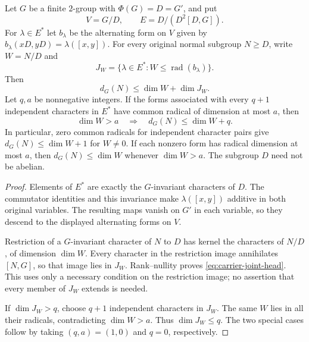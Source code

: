 \begin{lemma}\label{lem:carrier-joint-radicals}
Let $G$ be a finite $2$-group with $\Phi(G)=D=G'$, and put
\[
 V=G/D,\qquad E=D/(D^2[D,G]).
\]
For $\lambda\in E^*$ let $b_\lambda$ be the alternating form on $V$
given by $b_\lambda(xD,yD)=\lambda([x,y])$.
For every original normal subgroup $N\geq D$, write $W=N/D$ and
\[
 J_W=\{\lambda\in E^*: W\leq\operatorname{rad}(b_\lambda)\}.
\]
Then
\begin{equation}\label{eq:carrier-joint-head}
 d_G(N)\leq\dim W+\dim J_W.
\end{equation}
Let $q,a$ be nonnegative integers. If the forms associated with every
$q+1$ independent characters in
$E^*$ have common radical of dimension at most $a$, then
\[
 \dim W>a\quad\Longrightarrow\quad d_G(N)\leq\dim W+q.
\]
In particular, zero common radicals for independent character pairs give
$d_G(N)\leq\dim W+1$ for $W\ne0$. If each nonzero form has radical
dimension at most $a$, then $d_G(N)\leq\dim W$ whenever $\dim W>a$.
The subgroup $D$ need not be abelian.
\end{lemma}
\begin{proof}
Elements of $E^*$ are exactly the $G$-invariant characters of $D$.
The commutator identities and this invariance make
$\lambda([x,y])$ additive in both original variables. The resulting
maps vanish on $G'$ in each variable, so they descend to the displayed
alternating forms on $V$.

Restriction of a $G$-invariant character of $N$ to $D$ has kernel
the characters of $N/D$, of dimension $\dim W$. Every character in
the restriction image annihilates $[N,G]$, so that image lies in
$J_W$. Rank--nullity proves \eqref{eq:carrier-joint-head}. This uses
only a necessary condition on the restriction image; no assertion
that every member of $J_W$ extends is needed.

If $\dim J_W>q$, choose $q+1$ independent characters in $J_W$.
The same $W$ lies in all their radicals, contradicting
$\dim W>a$. Thus $\dim J_W\leq q$. The two special cases follow by
taking $(q,a)=(1,0)$ and $q=0$, respectively.
\end{proof}

